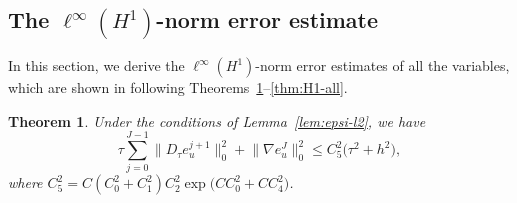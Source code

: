\documentclass[a4paper,fleqn]{cas-sc}
\numberwithin{equation}{section}
\newtheorem{theorem}{Theorem}[section]
\theoremstyle{definition}
\begin{document}
\subsection{The \texorpdfstring{$\ell^{\infty}(H^{1})$}{l-inf(H1)}-norm error estimate}

In this section, we derive the $\ell^{\infty}(H^{1})$-norm error estimates of all the variables,
which are shown in following Theorems~\ref{thm:H1-u}--\ref{thm:H1-all}.

\begin{theorem}\label{thm:H1-u}
Under the conditions of Lemma~\ref{lem:epsi-l2}, we have
\begin{equation}\label{eq:4.56}
  \tau\sum_{j=0}^{J-1}\bigl\|D_{\tau}e_{u}^{j+1}\bigr\|_{0}^{2}
  + \bigl\|\nabla e_{u}^{J}\bigr\|_{0}^{2}
  \leq C_{5}^{2}\bigl(\tau^{2} + h^{2}\bigr),
\end{equation}
where $C_{5}^{2} = C(C_{0}^{2}+C_{1}^{2})C_{2}^{2}\exp\!\bigl(CC_{0}^{2}+CC_{4}^{2}\bigr)$.
\end{theorem}
\end{document}
